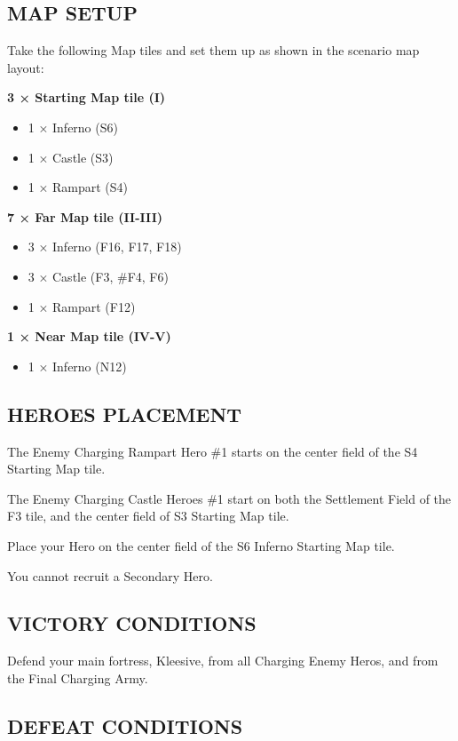 \begin{multicols*}{2}
\subsection*{\MakeUppercase{Map setup}}

Take the following Map tiles and set them up as shown in the scenario map layout:

\textbf{3 × Starting Map tile (I)}
\begin{itemize}
  \item 1 × Inferno (S6)
  \item 1 × Castle (S3)
  \item 1 × Rampart (S4)
\end{itemize}

\textbf{7 × Far Map tile (II-III)}
\begin{itemize}
  \item 3 × Inferno (F16, F17, F18)
  \item 3 × Castle (F3, \#F4, F6)
  \item 1 × Rampart (F12)
\end{itemize}

\textbf{1 × Near Map tile (IV-V)}
\begin{itemize}
  \item 1 × Inferno (N12)
\end{itemize}

\subsection*{\MakeUppercase{Heroes placement}}

The Enemy Charging Rampart Hero \#1 starts on the center field of the S4 Starting Map tile.

The Enemy Charging Castle Heroes \#1 start on both the Settlement Field of the F3 tile, and the center field of S3 Starting Map tile.

Place your Hero on the center field of the S6 Inferno Starting Map tile.

You cannot recruit a Secondary Hero.

\subsection*{\MakeUppercase{Victory Conditions}}

Defend your main fortress, Kleesive, from all Charging Enemy Heros, and from the Final Charging Army.

\subsection*{\MakeUppercase{Defeat Conditions}}


\end{multicols*}
